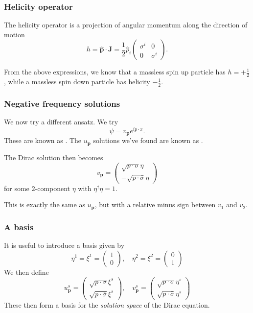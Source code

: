 \documentclass[a4paper]{article}
\begin{document}
\subsubsection*{Helicity operator}
\begin{defi}
 The helicity operator is a projection of angular momentum along the direction of motion
 \[
   h = \hat{\mathbf{p}}\cdot \mathbf{J} = \frac{1}{2} \hat{p}_i
   \begin{pmatrix}
     \sigma^i & 0\\
     0 & \sigma^i
   \end{pmatrix}.
 \]
\end{defi}
From the above expressions, we know that a massless spin up particle has $h = + \frac{1}{2}$, while a massless spin down particle has helicity $-\frac{1}{2}$. %

\subsubsection*{Negative frequency solutions}
We now try a different ansatz. We try
\[
  \psi = v_\mathbf{p} e^{i p\cdot x}.
\]
These are known as . The $u_\mathbf{p}$ solutions we've found are known as .

The Dirac solution then becomes
\[
  v_\mathbf{p} =
  \begin{pmatrix}
    \sqrt{p \cdot \sigma} \eta\\
    -\sqrt{p \cdot \bar\sigma} \eta
  \end{pmatrix}
\]
for some $2$-component $\eta$ with $\eta^\dagger \eta = 1$.

This is exactly the same as $u_\mathbf{p}$, but with a relative minus sign between $v_1$ and $v_2$.

\subsubsection*{A basis}
It is useful to introduce a basis given by
\[
  \eta^1 = \xi^1 =
  \begin{pmatrix}
    1\\0
  \end{pmatrix},\quad \eta^2 = \xi^2 =
  \begin{pmatrix}
    0\\1
  \end{pmatrix}
\]
We then define
\[
  u^s_\mathbf{p} =
  \begin{pmatrix}
    \sqrt{p\cdot \sigma} \xi^s\\
    \sqrt{p\cdot \bar\sigma} \xi^s
  \end{pmatrix}
  ,\quad v^s_\mathbf{p} =
  \begin{pmatrix}
    \sqrt{p\cdot \sigma} \eta^s\\
    \sqrt{p\cdot \bar\sigma} \eta^s
  \end{pmatrix}
\]
These then form a basis for the \emph{solution space} of the Dirac equation.
\end{document}
